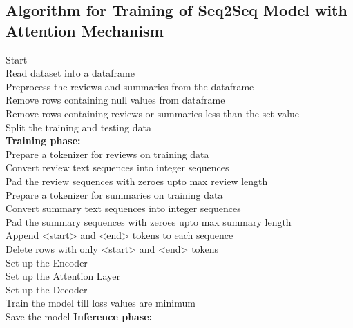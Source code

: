 \documentclass[11pt]{report}
\begin{document}
\subsection{Algorithm for  Training of Seq2Seq Model with Attention Mechanism}
\vspace{0.5cm}
\begin{algorithm}[H]
\SetAlgoLined
{}
Start \\
Read dataset into a dataframe \\
Preprocess the reviews and summaries from the dataframe \\
Remove rows containing null values from dataframe \\
Remove rows containing reviews or summaries less than the set value \\
Split the training and testing data \\
\textbf{Training phase:} \\
    \Begin 
    {
        Prepare a tokenizer for reviews on training data \\
        Convert review text sequences into integer sequences \\
        Pad the review sequences with zeroes upto max review length \\
        Prepare a tokenizer for summaries on training data \\
        Convert summary text sequences into integer sequences \\
        Pad the summary sequences with zeroes upto max summary length \\
        Append \textless start\textgreater \hspace{0.05cm} and \textless end\textgreater \hspace{0.05cm}  tokens to each sequence \\
        Delete rows with only \textless start\textgreater \hspace{0.05cm}  and \textless end\textgreater \hspace{0.05cm} tokens \\
        Set up the Encoder \\
        Set up the Attention Layer \\
        Set up the Decoder \\
        Train the model till loss values are minimum\\
        Save the model
    }
    \End
\textbf{Inference phase:} \\

\end{algorithm}
\end{document}
